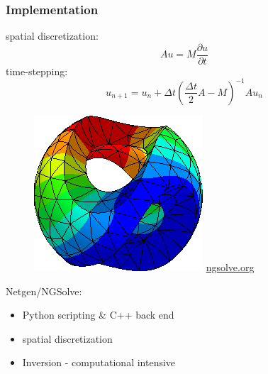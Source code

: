 \documentclass{beamer}
\newcommand*{\Dt}{\Delta{}t}
\begin{document}
\begin{frame}
  \frametitle{Implementation}
spatial discretization:
\[A u = M \frac{\partial{}u}{\partial{}t}\]
time-stepping:
\[ u_{n+1} =  u_n +  \Dt \left( \frac{\Dt}{2}A - M \right)^{-1} A u_n\]
\pause
\begin{figure}
\begin{center}
  \includegraphics[width=0.4\linewidth]{logo-col-med2.png}
  \url{ngsolve.org}
\end{center}
\end{figure}
Netgen/NGSolve:
\begin{itemize}
 \item Python scripting \& C++ back end
 \item spatial discretization
 \item Inversion - computational intensive
\end{itemize}

\end{frame}
\end{document}
